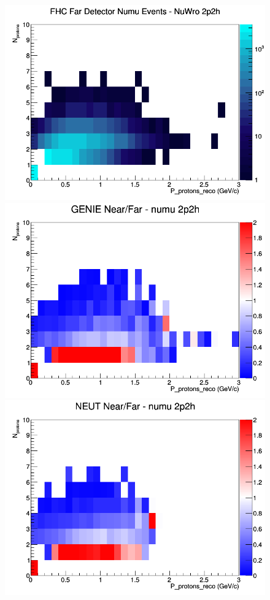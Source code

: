 \begin{figure}[h]
\endminipage
{}
\includegraphics[width=\linewidth]{eff_N_P/FGT/protons/2p2h_FHC_FD_numu_N_P_NuWro.png}
\endminipage
\newline
{}
\includegraphics[width=\linewidth]{eff_N_P/FGT/protons/ratios/2p2h_GENIE_numu_NF_N_P.png}
\endminipage
{}
\includegraphics[width=\linewidth]{eff_N_P/FGT/protons/ratios/2p2h_NEUT_numu_NF_N_P.png}

\end{figure}
